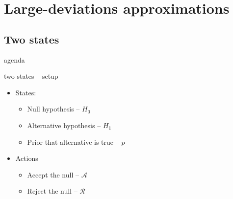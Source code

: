 \documentclass[square,]{gBakerBeamer}
\renewcommand{\|}{\,|\,}
\begin{document}
\section{Large-deviations approximations}
\label{sec:large-deviations}



\subsection{Two states}
\label{sec:two-states}

\begin{frame}{agenda}

  \tableofcontents[currentsection,sectionstyle=show/shaded]

\end{frame}


\begin{frame}{two states -- setup}

  \begin{itemize}
    \item States:
          \begin{itemize}
            \item Null hypothesis -- $H_0$
            \item Alternative hypothesis -- $H_1$
            \item Prior that alternative is true -- $p$\bigskip
          \end{itemize}

    \item<2-> Actions
          \begin{itemize}
            \item<2-> Accept the null -- $\mathcal{A}$
            \item<2-> Reject the null -- $\mathcal{R}$
          \end{itemize}
  \end{itemize}

  \note{%

  }
\end{frame}
\end{document}

